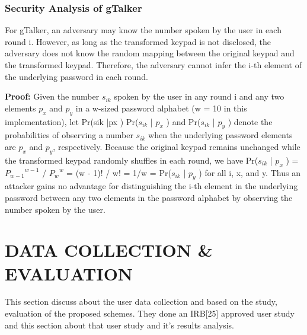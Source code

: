 \documentclass[12pt,a4paper,oneside]{report}
\begin{document}
\subsection{Security Analysis of gTalker}
For gTalker, an adversary
may know the number spoken by the user in each round i.
However, as long as the transformed keypad is not disclosed, the adversary does not know the random mapping
between the original keypad and the transformed keypad.
Therefore, the adversary cannot infer the i-th element of the
underlying password in each round. \newline

\textbf{Proof:} Given the number $s_{ik}$ spoken by the user in any
round i and any two elements $p_x$ and $p_y$ in a w-sized password
alphabet (w = 10 in this implementation), let Pr(sik |px ) Pr($s_{ik}$ | $p_x$ ) and
Pr($s_{ik}$ | $p_y$ ) denote the probabilities of observing a number
$s_{ik}$ when the underlying password elements are $p_x$ and $p_y$,
respectively. Because the original keypad remains unchanged
while the transformed keypad randomly shuffles in each round,
\newline we have Pr($s_{ik}$ | $p_x$ ) = ${P_{w-1}}^{w-1}$ / ${P_w}^w$ = (w - 1)! / w! = 1/w = Pr($s_{ik}$ | $p_y$ ) for all i, x, and y. Thus an attacker gains no
advantage for distinguishing the i-th element in the underlying
password between any two elements in the password alphabet
by observing the number spoken by the user.

\chapter{DATA COLLECTION \& EVALUATION}

This section discuss about the user data collection and based on the study, evaluation of the proposed schemes. They done an IRB[25] approved user study and this section about that user study and it's results analysis.
\end{document}
